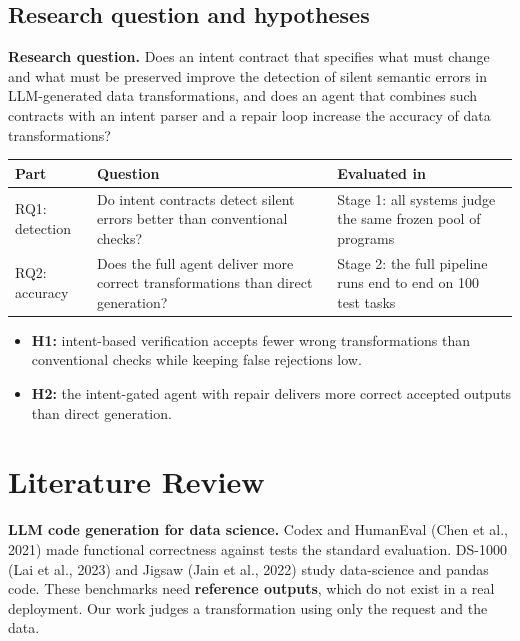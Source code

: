 \documentclass[11pt]{article}
\providecommand{\tightlist}{\setlength{\itemsep}{0pt}\setlength{\parskip}{0pt}}
\begin{document}
\subsection{Research question and hypotheses}

\textbf{Research question.} Does an intent contract that specifies what
must change and what must be preserved improve the detection of silent
semantic errors in LLM-generated data transformations, and does an agent
that combines such contracts with an intent parser and a repair loop
increase the accuracy of data transformations?

\begin{table}[!tp]
\centering\footnotesize\setlength{\tabcolsep}{3pt}\renewcommand{\arraystretch}{1.1}
\begin{tabularx}{\textwidth}{l>{\raggedright\arraybackslash}X>{\raggedright\arraybackslash}X}
\toprule
\textbf{Part} & \textbf{Question} & \textbf{Evaluated in} \\
\midrule
RQ1: detection & Do intent contracts detect silent errors better than conventional checks? & Stage 1: all systems judge the same frozen pool of programs \\
RQ2: accuracy & Does the full agent deliver more correct transformations than direct generation? & Stage 2: the full pipeline runs end to end on 100 test tasks \\
\bottomrule
\end{tabularx}
\end{table}

\begin{itemize}
\tightlist
\item
  \textbf{H1:} intent-based verification accepts fewer wrong
  transformations than conventional checks while keeping false
  rejections low.
\item
  \textbf{H2:} the intent-gated agent with repair delivers more correct
  accepted outputs than direct generation.
\end{itemize}

\section{Literature Review}

\textbf{LLM code generation for data science.} Codex and HumanEval (Chen
et al., 2021) made functional correctness against tests the standard
evaluation. DS-1000 (Lai et al., 2023) and Jigsaw (Jain et al., 2022)
study data-science and pandas code. These benchmarks need
\textbf{reference outputs}, which do not exist in a real deployment. Our
work judges a transformation using only the request and the data.
\end{document}
